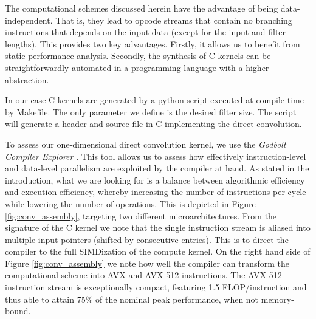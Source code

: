 \documentclass[]{usiinfbachelorproject}
\begin{document}
		
		The computational schemes discussed herein have the advantage of being data-independent.
		That is, they lead to opcode streams that contain no branching instructions that depends on the input data (except for the input and filter lengths).
		This provides two key advantages.
		Firstly, it allows us to benefit from static performance analysis.
		Secondly, the synthesis of C kernels can be straightforwardly automated in a programming language with a higher abstraction.
		
		In our case C kernels are generated by a python script executed at compile time by Makefile. The only parameter we define is the desired filter size. The script will generate a header and source file in C implementing the direct convolution.
		
		To assess our one-dimensional direct convolution kernel, we use the {\it Godbolt Compiler Explorer} \cite{godbolt}. This tool allows us to assess how effectively instruction-level and data-level parallelism are exploited by the compiler at hand. As stated in the introduction, what we are looking for is a balance between algorithmic efficiency and execution efficiency, whereby increasing the number of instructions per cycle while lowering the number of operations. This is depicted in Figure \ref{fig:conv_assembly}, targeting two different microarchitectures. From the signature of the C kernel we note that the single instruction stream is aliased into multiple input pointers (shifted by consecutive entries). This is to direct the compiler to the full SIMDization of the compute kernel. On the right hand side of Figure \ref{fig:conv_assembly} we note how well the compiler can transform the computational scheme into AVX and AVX-512 instructions. The AVX-512 instruction stream is exceptionally compact, featuring 1.5 FLOP/instruction and thus able to attain 75\% of the nominal peak performance, when not memory-bound.
		
\end{document}
